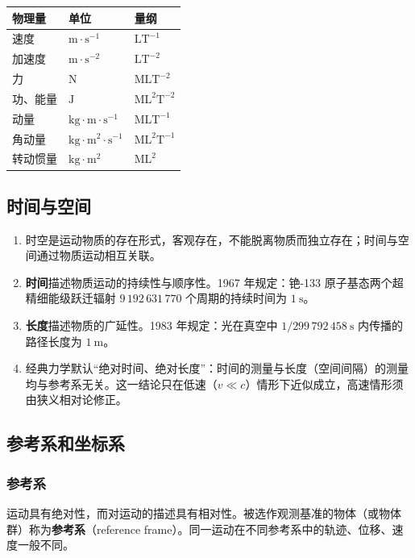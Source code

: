         \begin{center}
        \begin{tabular}{lll}
        \toprule
        物理量 & 单位 & 量纲 \\
        \midrule
        速度 & $\mathrm{m\cdot s^{-1}}$ & $\mathrm{LT^{-1}}$ \\
        加速度 & $\mathrm{m\cdot s^{-2}}$ & $\mathrm{LT^{-2}}$ \\
        力 & $\mathrm{N}$ & $\mathrm{MLT^{-2}}$ \\
        功、能量 & $\mathrm{J}$ & $\mathrm{ML^{2}T^{-2}}$ \\
        动量 & $\mathrm{kg\cdot m\cdot s^{-1}}$ & $\mathrm{MLT^{-1}}$ \\
        角动量 & $\mathrm{kg\cdot m^{2}\cdot s^{-1}}$ & $\mathrm{ML^{2}T^{-1}}$ \\
        转动惯量 & $\mathrm{kg\cdot m^{2}}$ & $\mathrm{ML^{2}}$ \\
        \bottomrule
        \end{tabular}
        \end{center}

    \subsection{时间与空间}
    \begin{enumerate}
        \item 时空是运动物质的存在形式，客观存在，不能脱离物质而独立存在；时间与空间通过物质运动相互关联。
        \item \textbf{时间}描述物质运动的持续性与顺序性。1967 年规定：铯-133 原子基态两个超精细能级跃迁辐射 $9\,192\,631\,770$ 个周期的持续时间为 $1\ \mathrm{s}$。
        \item \textbf{长度}描述物质的广延性。1983 年规定：光在真空中 $1/299\,792\,458\ \mathrm{s}$ 内传播的路径长度为 $1\ \mathrm{m}$。
        \item 经典力学默认“绝对时间、绝对长度”：时间的测量与长度（空间间隔）的测量均与参考系无关。这一结论只在低速（$v\ll c$）情形下近似成立，高速情形须由狭义相对论修正。
    \end{enumerate}

    \subsection{参考系和坐标系}
        \subsubsection{参考系}
        运动具有绝对性，而对运动的描述具有相对性。被选作观测基准的物体（或物体群）称为\textbf{参考系}（reference frame）。同一运动在不同参考系中的轨迹、位移、速度一般不同。

